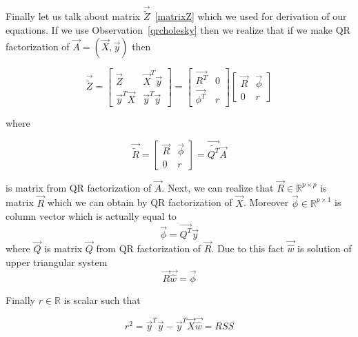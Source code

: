 Finally let us talk about matrix $\vec{\tilde{Z}}$~\eqref{matrixZ} which we used for derivation of our equations. If we use Observation~\ref{qrcholesky} then we realize that if we make QR factorization of $\vec{A} = (\vec{X}, \vec{y})$ then

\begin{equation}
    \vec{\tilde{Z}} = 
    \begin{bmatrix}
        \vec{Z} & \vec{X}^T\vec{y} \\
    \vec{y}^T\vec{X} & \vec{y}^T\vec{y}
    \end{bmatrix} 
    = 
    \begin{bmatrix}
        \vec{R^T} & 0 \\
    \vec{\phi^T} & r
    \end{bmatrix} 
    \begin{bmatrix} 
        \vec{R} & \vec{\phi} \\
     0 & r
    \end{bmatrix} 
\end{equation}

where 

\begin{equation}
    \vec{\tilde{R}} = 
    \begin{bmatrix}
        \vec{R} & \vec{\phi} \\
     0 & r
    \end{bmatrix} 
    = \vec{\tilde{Q^T}}\vec{A}
\end{equation}

is matrix from QR factorization of $\vec{A}$. 
Next, we can realize that $\vec{R} \in \mathbb{R}^{p \times p}$ is matrix $\vec{R}$ which we can obtain by QR factorization of $\vec{X}$. 
Moreover $\vec{\phi} \in \mathbb{R}^{p \times 1}$ is column vector which is actually equal to
\begin{equation}
    \vec{\phi} =  \vec{Q^T}\vec{y}
\end{equation}
where $\vec{Q}$ is matrix $\vec{Q}$ from QR factorization of $\vec{R}$.
Due to this fact $\vec{\hat{w}}$ is solution of upper triangular system 
\begin{equation}
    \vec{R}\vec{\hat{w}} = \vec{\phi}
\end{equation}

Finally $r \in \mathbb{R}$ is scalar such that 

\begin{equation}
    r^2 = \vec{y}^T\vec{y} - \vec{y}^T\vec{X}\vec{\hat{w}} = RSS
\end{equation}

